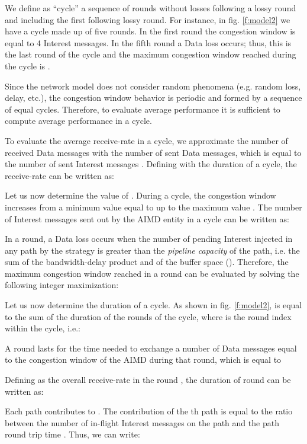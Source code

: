 \documentclass{sig-alternate-10pt}
\begin{document}
We define as ``cycle'' a sequence of rounds without losses following a lossy round and including the first following lossy round. 
For instance, in fig. \ref{f:model2} we have a cycle made up of five rounds. In the first round the congestion window  is equal to 4 Interest messages. In the fifth round a Data loss occurs; thus, this is the last round of the cycle and the maximum congestion window reached during the cycle is .

Since the network model does not consider random phenomena (e.g. random loss, delay, etc.), the congestion window behavior is periodic and formed by a sequence of equal cycles. Therefore, to evaluate average performance it is sufficient to compute average performance in a cycle.

To evaluate the average receive-rate  in a cycle, we approximate the number of received Data messages with the number of sent Data messages, which is equal to the number of sent Interest messages .
Defining with  the duration of a cycle, the receive-rate  can be written as:



Let us now determine the value of . During a cycle, the congestion window increases from a minimum value equal to  up to the maximum value . The number  of Interest messages sent out by the AIMD entity in a cycle can be written as:

In a round, a Data loss occurs when the number of pending Interest injected in any path by the strategy is greater than the \emph{pipeline capacity} of the path, i.e. the sum of the bandwidth-delay product  and of the buffer space (). Therefore, the maximum congestion window  reached in a round can be evaluated by solving the following integer maximization:


Let us now determine the duration  of a cycle. As shown in fig. \ref{f:model2},  is equal to the sum of the duration  of the rounds of the cycle, where  is the round index within the cycle, i.e.:

A round  lasts for the time needed to exchange a number of Data messages equal to the congestion window  of the AIMD during that round, which is equal to

Defining as  the overall receive-rate in the round , the duration  of round  can be written as:

Each path contributes to . The contribution  of the th path is equal to the ratio between the number of in-flight Interest messages  on the path and the path round trip time . Thus, we can write:
\end{document}
